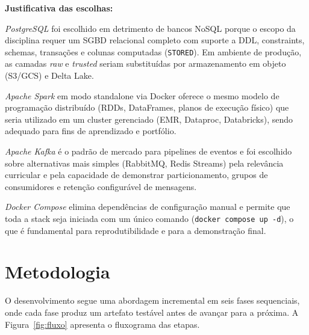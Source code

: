 \documentclass[12pt]{article}
\begin{document}
\noindent\textbf{Justificativa das escolhas:}

\textit{PostgreSQL} foi escolhido em detrimento de bancos NoSQL porque o escopo
da disciplina requer um SGBD relacional completo com suporte a DDL, constraints,
schemas, transações e colunas computadas (\texttt{STORED}). Em ambiente de
produção, as camadas \textit{raw} e \textit{trusted} seriam substituídas por
armazenamento em objeto (S3/GCS) e Delta Lake.

\textit{Apache Spark} em modo standalone via Docker oferece o mesmo modelo de
programação distribuído (RDDs, DataFrames, planos de execução físico) que seria
utilizado em um cluster gerenciado (EMR, Dataproc, Databricks), sendo adequado
para fins de aprendizado e portfólio.

\textit{Apache Kafka} é o padrão de mercado para pipelines de eventos e foi
escolhido sobre alternativas mais simples (RabbitMQ, Redis Streams) pela
relevância curricular e pela capacidade de demonstrar particionamento,
grupos de consumidores e retenção configurável de mensagens.

\textit{Docker Compose} elimina dependências de configuração manual e permite
que toda a stack seja iniciada com um único comando (\texttt{docker compose up -d}),
o que é fundamental para reprodutibilidade e para a demonstração final.


\section{Metodologia}

O desenvolvimento segue uma abordagem incremental em seis fases sequenciais,
onde cada fase produz um artefato testável antes de avançar para a próxima.
A Figura~\ref{fig:fluxo} apresenta o fluxograma das etapas.
\end{document}
